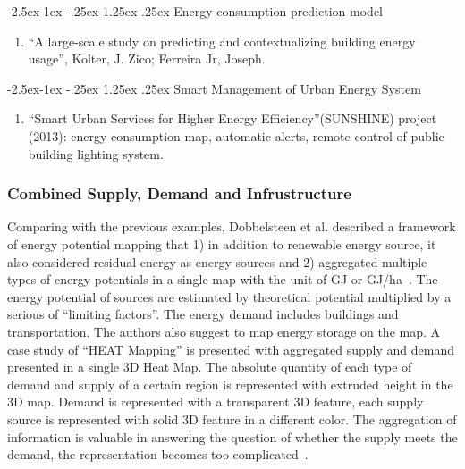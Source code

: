 \documentclass[hidelinks,12pt]{article}
\makeatletter
\renewcommand\paragraph{\@startsection{paragraph}{4}{\z@}%
            {-2.5ex\@plus -1ex \@minus -.25ex}%
            {1.25ex \@plus .25ex}%
            {\normalfont\normalsize\bfseries}}
\makeatother
\begin{document}
\paragraph{Energy consumption prediction model}
    \begin{enumerate}[label*=\arabic*.]
      \item ``A large-scale study on predicting and contextualizing building energy usage'', Kolter, J. Zico; Ferreira Jr, Joseph.
    \end{enumerate}
\paragraph{Smart Management of Urban Energy System}
    \begin{enumerate}[label*=\arabic*.]
    \item ``Smart Urban Services for Higher Energy
    Efficiency''(SUNSHINE) project (2013): energy consumption map,
    automatic alerts, remote control of public building lighting
    system.
    \end{enumerate}

\subsubsection{Combined Supply, Demand and Infrustructure}
Comparing with the previous examples, Dobbelsteen et al. described a
framework of energy potential mapping that 1) in addition to renewable
energy source, it also considered residual energy as energy sources
and 2) aggregated multiple types of energy potentials in a single map
with the unit of GJ or GJ/ha~\cite{Dobbelsteen2013}. The energy
potential of sources are estimated by theoretical potential multiplied
by a serious of ``limiting factors''. The energy demand includes
buildings and transportation. The authors also suggest to map energy
storage on the map. A case study of ``HEAT Mapping'' is presented with
aggregated supply and demand presented in a single 3D Heat Map. The
absolute quantity of each type of demand and supply of a certain
region is represented with extruded height in the 3D map. Demand is
represented with a transparent 3D feature, each supply source is
represented with solid 3D feature in a different color. The
aggregation of information is valuable in answering the question of
whether the supply meets the demand, the representation becomes too
complicated~\cite{Dobbelsteen2013}.
\end{document}
